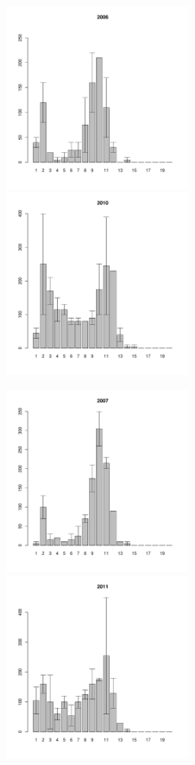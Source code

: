 \begin{figure}[h]

\begin{multicols}{3}
\hfill
\includegraphics[width=60mm]{../White_Sea/Ryashkov_ZRS/zrs_2006_.pdf}
\hfill
\includegraphics[width=60mm]{../White_Sea/Ryashkov_ZRS/zrs_2010_.pdf}
\hfill

\end{multicols}



\begin{multicols}{3}
\hfill
\includegraphics[width=60mm]{../White_Sea/Ryashkov_ZRS/zrs_2007_.pdf}
\hfill
\includegraphics[width=60mm]{../White_Sea/Ryashkov_ZRS/zrs_2011_.pdf}
\hfill


\end{multicols}
\end{figure}
